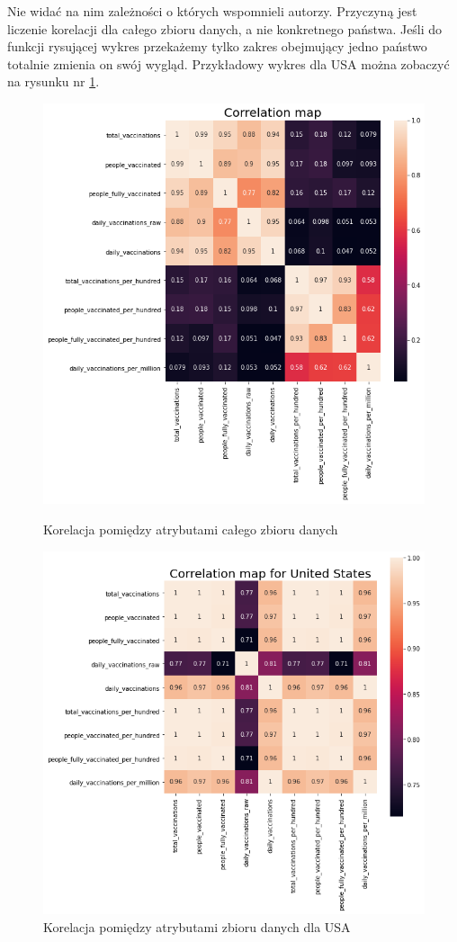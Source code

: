 \documentclass[12pt, oneside]{article}
\begin{document}
Nie widać na nim zależności o których wspomnieli autorzy. Przyczyną jest liczenie korelacji dla całego zbioru danych, a nie konkretnego państwa. Jeśli do funkcji rysującej wykres przekażemy tylko zakres  obejmujący jedno państwo totalnie zmienia on swój wygląd. Przykładowy wykres dla USA można zobaczyć na rysunku nr \ref{Rys:corrHeatMapUsa}.


\begin{figure}[!ht]

\centering
\includegraphics[scale=0.45]{../img/corelation.png} 
\caption{Korelacja pomiędzy atrybutami całego zbioru danych\label{Rys:corrHeatMapWorld}}

\centering
\includegraphics[scale=0.45]{../img/usa_corr.png} 
\caption{Korelacja pomiędzy atrybutami zbioru danych dla USA}
\label{Rys:corrHeatMapUsa}

\end{figure}
\end{document}
